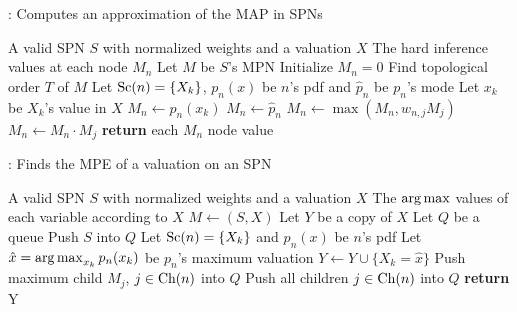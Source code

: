 \begin{algorithm}[h]
  \caption{: Computes an approximation of the MAP in SPNs}
  \begin{algorithmic}[1]
    \Require A valid SPN $S$ with normalized weights and a valuation $X$
    \Ensure The hard inference values at each node $M_n$
    \State Let $M$ be $S$'s MPN
    \State Initialize $M_n=0$
    \State Find topological order $T$ of $M$
        \State Let $\operatorname*{\text{Sc}}(n)=\{X_k\}$, $p_n(x)$ be $n$'s pdf and $\hat{p}_n$ be $p_n$'s mode
          \State Let $x_k$ be $X_k$'s value in $X$
          \State $M_n\gets p_n(x_k)$
        \Else%
          \State $M_n\gets\hat{p}_n$
        \EndIf%
          \State $M_n\gets\max(M_n, w_{n,j}M_j)$
        \EndFor%
      \Else%
          \State $M_n\gets M_n\cdot M_j$
        \EndFor%
      \EndIf
    \EndFor%
    \State \textbf{return} each $M_n$ node value
  \end{algorithmic}
\end{algorithm}

\begin{algorithm}[h]
  \caption{: Finds the MPE of a valuation on an SPN}
  \begin{algorithmic}[1]
    \Require A valid SPN $S$ with normalized weights and a valuation $X$
    \Ensure The $\operatorname*{arg\,max}$ values of each variable according to $X$
    \State $M\gets$$(S, X)$
    \State Let $Y$ be a copy of $X$
    \State Let $Q$ be a queue
    \State Push $S$ into $Q$
        \State Let $\operatorname*{\text{Sc}}(n)=\{X_k\}$ and $p_n(x)$ be $n$'s pdf
        \State Let $\hat{x}=\operatorname*{arg\,max}_{x_k} p_n(x_k)$ be $p_n$'s maximum valuation
          \State $Y\gets Y\cup\{X_k=\hat{x}\}$
        \EndIf%
        \State Push maximum child $M_j$, $j\in\operatorname*{\text{Ch}}(n)$ into $Q$
      \Else%
        \State Push all children $j\in\operatorname*{\text{Ch}}(n)$ into $Q$
      \EndIf
    \EndFor%
    \State \textbf{return} Y
  \end{algorithmic}
\end{algorithm}
